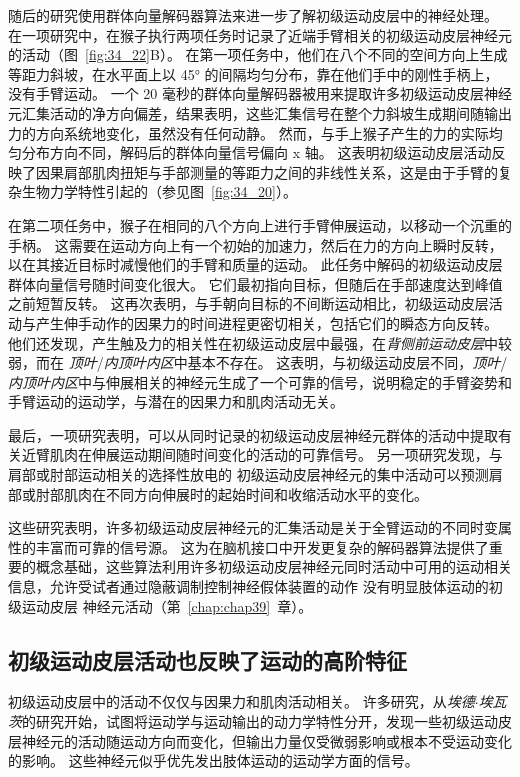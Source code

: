 随后的研究使用群体向量解码器算法来进一步了解初级运动皮层中的神经处理。
在一项研究中，在猴子执行两项任务时记录了近端手臂相关的初级运动皮层神经元的活动（图~\ref{fig:34_22}B）。
在第一项任务中，他们在八个不同的空间方向上生成等距力斜坡，在水平面上以 45° 的间隔均匀分布，靠在他们手中的刚性手柄上，没有手臂运动。
一个 20 毫秒的群体向量解码器被用来提取许多初级运动皮层神经元汇集活动的净方向偏差，结果表明，这些汇集信号在整个力斜坡生成期间随输出力的方向系统地变化，虽然没有任何动静。
然而，与手上猴子产生的力的实际均匀分布方向不同，解码后的群体向量信号偏向 x 轴。
这表明初级运动皮层活动反映了因果肩部肌肉扭矩与手部测量的等距力之间的非线性关系，这是由于手臂的复杂生物力学特性引起的（参见图~\ref{fig:34_20}）。


在第二项任务中，猴子在相同的八个方向上进行手臂伸展运动，以移动一个沉重的手柄。
这需要在运动方向上有一个初始的加速力，然后在力的方向上瞬时反转，以在其接近目标时减慢他们的手臂和质量的运动。
此任务中解码的初级运动皮层群体向量信号随时间变化很大。
它们最初指向目标，但随后在手部速度达到峰值之前短暂反转。
这再次表明，与手朝向目标的不间断运动相比，初级运动皮层活动与产生伸手动作的因果力的时间进程更密切相关，包括它们的瞬态方向反转。
他们还发现，产生触及力的相关性在初级运动皮层中最强，在\textit{背侧前运动皮层}中较弱，而在 \textit{顶叶}/\textit{内顶叶内区}中基本不存在。
这表明，与初级运动皮层不同，\textit{顶叶}/\textit{内顶叶内区}中与伸展相关的神经元生成了一个可靠的信号，说明稳定的手臂姿势和手臂运动的运动学，与潜在的因果力和肌肉活动无关。


最后，一项研究表明，可以从同时记录的初级运动皮层神经元群体的活动中提取有关近臂肌肉在伸展运动期间随时间变化的活动的可靠信号。
另一项研究发现，与肩部或肘部运动相关的选择性放电的 初级运动皮层神经元的集中活动可以预测肩部或肘部肌肉在不同方向伸展时的起始时间和收缩活动水平的变化。


这些研究表明，许多初级运动皮层神经元的汇集活动是关于全臂运动的不同时变属性的丰富而可靠的信号源。
这为在脑机接口中开发更复杂的解码器算法提供了重要的概念基础，这些算法利用许多初级运动皮层神经元同时活动中可用的运动相关信息，允许受试者通过隐蔽调制控制神经假体装置的动作 没有明显肢体运动的初级运动皮层 神经元活动（第~\ref{chap:chap39}~章）。



\subsection{初级运动皮层活动也反映了运动的高阶特征}

初级运动皮层中的活动不仅仅与因果力和肌肉活动相关。
许多研究，从\textit{埃德$\cdot$埃瓦茨}的研究开始，试图将运动学与运动输出的动力学特性分开，发现一些初级运动皮层神经元的活动随运动方向而变化，但输出力量仅受微弱影响或根本不受运动变化的影响。
这些神经元似乎优先发出肢体运动的运动学方面的信号。


